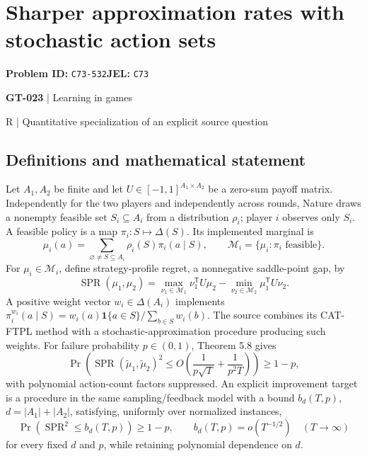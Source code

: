 \documentclass[11pt,a4paper]{article}
\begin{document}
\section*{Sharper approximation rates with stochastic action sets}
\textbf{Problem ID:} \texttt{C73-532}\quad \textbf{JEL:} \texttt{C73}\par
\label{problem:OP-0153}
\label{game:GT-023}
{\sffamily\small\color{muted}
{\sffamily\small\color{muted}\textbf{GT-023} | Learning in games\par R | Quantitative specialization of an explicit source question\par}
\par}
\subsection*{Definitions and mathematical statement}
Let $A_1,A_2$ be finite and let $U\in[-1,1]^{A_1\times A_2}$ be a zero-sum payoff matrix. Independently for the two players and independently across rounds, Nature draws a nonempty feasible set $S_i\subseteq A_i$ from a distribution $\rho_i$; player $i$ observes only $S_i$. A feasible policy is a map $\pi_i:S\mapsto\Delta(S)$. Its implemented marginal is
\[
 \mu_i(a)=\sum_{\varnothing\ne S\subseteq A_i}\rho_i(S)\pi_i(a\mid S),
 \qquad \mathcal M_i=\{\mu_i:\pi_i\text{ feasible}\}.
\]
For $\mu_i\in\mathcal M_i$, define strategy-profile regret, a nonnegative saddle-point gap, by
\[
 \operatorname{SPR}(\mu_1,\mu_2)=
 \max_{\nu_1\in\mathcal M_1}\nu_1^{\mathsf T}U\mu_2
 -\min_{\nu_2\in\mathcal M_2}\mu_1^{\mathsf T}U\nu_2.
\]
A positive weight vector $w_i\in\Delta(A_i)$ implements
$\pi_i^{w_i}(a\mid S)=w_i(a)\mathbf1\{a\in S\}/\sum_{b\in S}w_i(b)$.
The source combines its CAT-FTPL method with a stochastic-approximation procedure producing such weights. For failure probability $p\in(0,1)$, Theorem 5.8 gives
\[
 \Pr\!\left(\operatorname{SPR}(\widetilde\mu_1,\widetilde\mu_2)^2
 \leq O\!\left(\frac1{p\sqrt T}+\frac1{p^2T}\right)\right)\geq1-p,
\]
with polynomial action-count factors suppressed. An explicit improvement target is a procedure in the same sampling/feedback model with a bound $b_{d}(T,p)$, $d=|A_1|+|A_2|$, satisfying, uniformly over normalized instances,
\[
 \Pr(\operatorname{SPR}^2\leq b_d(T,p))\geq1-p,
 \qquad b_d(T,p)=o(T^{-1/2})\quad(T\to\infty)
\]
for every fixed $d$ and $p$, while retaining polynomial dependence on $d$.
\end{document}
